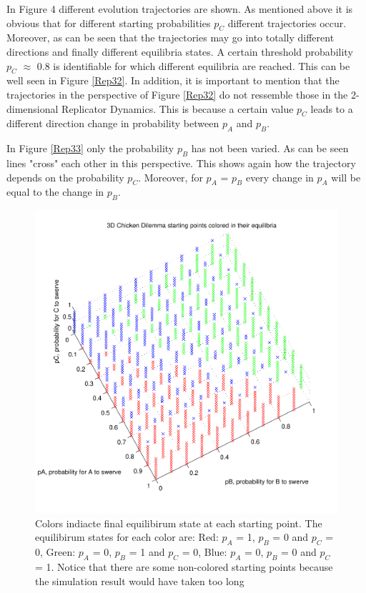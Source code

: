 \documentclass[11pt]{article}
\begin{document}
In Figure 4 different evolution trajectories are shown. As mentioned above it is obvious that for different starting probabilities $p_C$ different trajectories occur. Moreover, as can be seen that the trajectories may go into totally different directions and finally different equilibria states. A certain threshold probability $p_C$ $\approx$ 0.8 is identifiable for which different equilibria are reached. This can be well seen in Figure \ref{Rep32}. 
In addition, it is important to mention that the trajectories in the perspective of Figure \ref{Rep32} do not ressemble those in the 2-dimensional Replicator Dynamics. This is because  a certain value $p_C$ leads to a different direction change in probability between $p_A$ and $p_B$.
\newline

In Figure \ref{Rep33} only the probability $p_B$ has not been varied. As can be seen lines "cross" each other in this perspective. This shows again how the trajectory depends on the probability $p_C$. Moreover, for $p_A$ = $p_B$ every change in $p_A$ will be equal to the change in $p_B$.




\begin{figure}[h]
\centering
\includegraphics[scale=1]{PhaseDiagramm3D.pdf}
\caption[]{Colors indiacte final equilibirum state at each starting point. The equilibirum states for each color are: 
 Red: $p_A$ = 1, $p_B$ = 0 and $p_C$ = 0, Green: $p_A$ = 0, $p_B$ = 1 and $p_C$ = 0, Blue: $p_A$ = 0, $p_B$ = 0 and $p_C$ = 1. Notice that there are some non-colored starting points because the simulation result would have taken too long}
\label{Phase3}
\end{figure}
\end{document}
